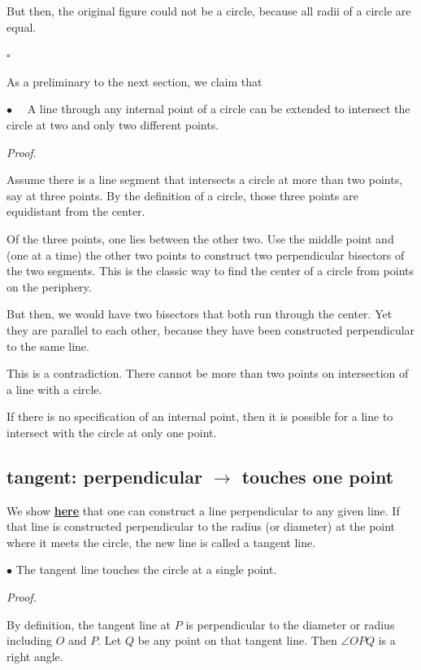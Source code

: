 \documentclass[11pt, oneside]{article}
\begin{document}
But then, the original figure could not be a circle, because all radii of a circle are equal.

$\square$

As a preliminary to the next section, we claim that 

$\bullet$ \ \ A line through any internal point of a circle can be extended to intersect the circle at two and only two different points.

\emph{Proof}.

Assume there is a line segment that intersects a circle at more than two points, say at three points.  By the definition of a circle, those three points are equidistant from the center.

Of the three points, one lies between the other two.  Use the middle point and (one at a time) the other two points to construct two perpendicular bisectors of the two segments.  This is the classic way to find the center of a circle from points on the periphery.

But then, we would have two bisectors that both run through the center.  Yet they are parallel to each other, because they have been constructed perpendicular to the same line.

This is a contradiction.  There cannot be more than two points on intersection of a line with a circle.

If there is no specification of an internal point, then it is possible for a line to intersect with the circle at only one point.

\subsection*{tangent:  perpendicular $\rightarrow$ touches one point}

\label{sec:tangent_one_point}

We show \hyperref[sec:Euclid11]{\textbf{here}} that one can construct a line perpendicular to any given line.  If that line is constructed perpendicular to the radius (or diameter) at the point where it meets the circle, the new line is called a tangent line.  

$\bullet$   The tangent line touches the circle at a single point.

\emph{Proof.}

By definition, the tangent line at $P$ is perpendicular to the diameter or radius including $O$ and $P$.  Let $Q$ be any point on that tangent line.  Then $\angle OPQ$ is a right angle.
\end{document}
